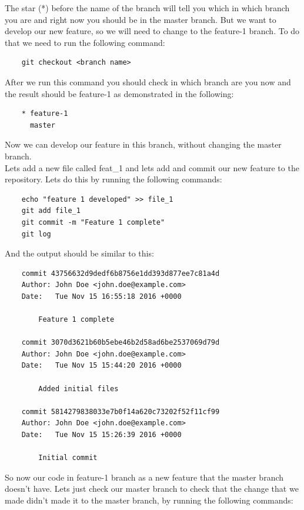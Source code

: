 \documentclass{article}
\begin{document}
The star (*) before the name of the branch will tell you which in which branch you are and right now you should be in the master branch. But we want to develop our new feature, so we will need to change to the feature-1 branch. To do that we need to run the following command:

\begin{lstlisting}
	git checkout <branch name>
\end{lstlisting}

After we run this command you should check in which branch are you now and the result should be feature-1 as demonstrated in the following:

\begin{lstlisting}
	* feature-1
	  master
\end{lstlisting}

Now we can develop our feature in this branch, without changing the master branch.\\
Lets add a new file called feat\_1 and lets add and commit our new feature to the repository. Lets do this by running the following commands:

\begin{lstlisting}
	echo "feature 1 developed" >> file_1
	git add file_1
	git commit -m "Feature 1 complete"
	git log
\end{lstlisting}

And the output should be similar to this:

\begin{lstlisting}
	commit 43756632d9dedf6b8756e1dd393d877ee7c81a4d
	Author: John Doe <john.doe@example.com>
	Date:   Tue Nov 15 16:55:18 2016 +0000

    	Feature 1 complete

	commit 3070d3621b60b5ebe46b2d58ad6be2537069d79d
	Author: John Doe <john.doe@example.com>
	Date:   Tue Nov 15 15:44:20 2016 +0000

    	Added initial files

	commit 5814279838033e7b0f14a620c73202f52f11cf99
	Author: John Doe <john.doe@example.com>
	Date:   Tue Nov 15 15:26:39 2016 +0000

    	Initial commit
\end{lstlisting}

So now our code in feature-1 branch as a new feature that the master branch doesn't have. Lets just check our master branch to check that the change that we made didn't made it to the master branch, by running the following commands:
\end{document}

